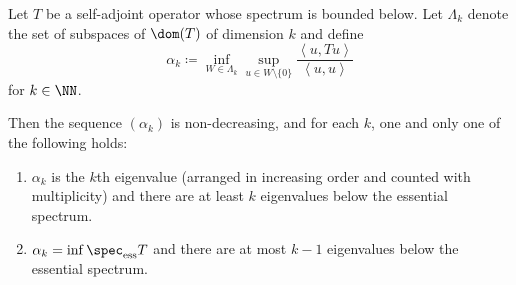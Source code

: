 \documentclass[oneside,reqno,letterpaper]{amsart}
\newcommand{\essspec}{\spec_{\text{ess}}}
\begin{document}
\begin{theorem}
  Let \(T\) be a self-adjoint operator whose spectrum is bounded below. 
  Let \(\Lambda_k\) denote the set of subspaces of \(\dom(T)\) of dimension \(k\) and define 
  \[
    \alpha_k \coloneqq \inf_{W \in \Lambda_k} \sup_{u \in W \setminus \{0\}} \frac{\left< u, Tu \right>}{\left< u, u \right>} 
  \] 
  for \(k \in \NN\). 

  Then the sequence \((\alpha_k)\) is non-decreasing, and for each \(k\), one and only one of the following holds:
  \begin{enumerate}[label=(\alph*)]
    \item \(\alpha_k\) is the \(k\)th eigenvalue (arranged in increasing order and counted with multiplicity) and there are at least \(k\) eigenvalues below the essential spectrum. 
    \item \(\alpha_k = \inf \essspec T\) and there are at most \(k - 1\) eigenvalues below the essential spectrum. 
  \end{enumerate}
\end{theorem}
\end{document}
